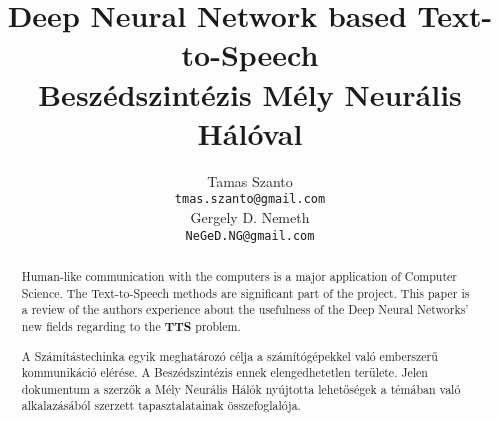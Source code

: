 \documentclass{article}
\title{Deep Neural Network based Text-to-Speech
	\\
	Beszédszintézis Mély Neurális Hálóval}
\author{
	Tamas Szanto\\
	\texttt{tmas.szanto@gmail.com} \\
	\AND
	Gergely D. Nemeth\\
	\texttt{NeGeD.NG@gmail.com} \\
}
\begin{document}

\maketitle
\chapter{}
\begin{abstract}
  Human-like communication with the computers is a major application of Computer Science. The Text-to-Speech methods are significant part of the project. This paper is a review of the authors experience about the usefulness of the Deep Neural Networks' new fields regarding to the \textbf{TTS} problem.
\end{abstract}

\begin{abstract}
	A Számítástechinka egyik meghatározó célja a számítógépekkel való emberszerű kommunikáció elérése. A Beszédszintézis ennek elengedhetetlen területe. Jelen dokumentum a szerzők a Mély Neurális Hálók nyújtotta lehetőségek a témában való alkalazásából szerzett tapasztalatainak összefoglalója. 
\end{abstract}

\clearpage

\chapter{}

\chapter{}

\chapter{}

\chapter{}

\chapter{}


\clearpage
\chapter{}

\chapter{}

\end{document}
